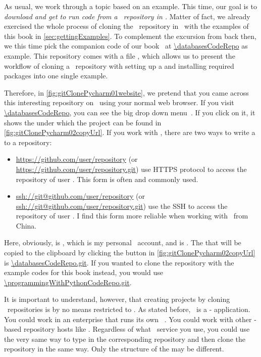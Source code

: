 As usual, we work through a topic based on an example.
This time, our goal is to \emph{download and get to run code from a \github\ repository in \pycharm.}
Matter of fact, we already exercised the whole process of cloning the \github\ repository in \pycharm\ with the examples of this book in \cref{sec:gettingExamples}.
To complement the excursion from back then, we this time pick the companion code of our  book~\cite{databases} at \url{\databasesCodeRepo} as example.
This repository comes with a file , which allows us to present the workflow of cloning a \git\ repository with setting up a  and installing required packages into one single example.

Therefore, in \cref{fig:gitClonePycharm01website}, we pretend that you came across this interesting repository on \github\ using your normal web browser.
If you visit \url{\databasesCodeRepo}, you can see the big drop down menu~.
If you click on it, it shows the   under which the project can be found in \cref{fig:gitClonePycharm02copyUrl}.
If you work with \github, there are two ways to write a  to a repository:%
%
\begin{itemize}%
%
\item \url{https://github.com/user/repository} (or \url{https://github.com/user/repository.git}) use \gls{HTTPS} protocol to access the repository  of user . %
This form is often and commonly used.%
%
\item \url{ssh://git@github.com/user/repository} (or \url{ssh://git@github.com/user/repository.git}) use the \gls{SSH} to access the repository  of user . %
I find this form more reliable when working with \github\ from China.%
%
\end{itemize}%
%
Here, obviously,  is , which is my personal \github\ account, and  is .
The  that will be copied to the clipboard by clicking the button in \cref{fig:gitClonePycharm02copyUrl} is \url{\databasesCodeRepo.git}.
If you wanted to clone the repository with the example codes for this book instead, you would use \url{\programmingWithPythonCodeRepo.git}.

It is important to understand, however, that creating projects by cloning \git\ repositories is by no means restricted to \github.
As stated before, \git\ is a - application.
You could work in an enterprise that runs its own \git\ .
You could work with other \git-based repository hosts like .
Regardless of what \git\ service you use, you could use the very same way to type in the corresponding repository  and then clone the repository in the same way.
Only the structure of the  may be different.

